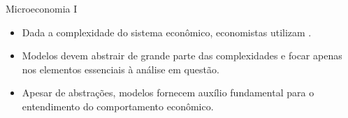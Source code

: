 \documentclass[10pt]{beamer}
\begin{document}
\begin{frame}
    {Microeconomia I}
    \begin{itemize}
        \item Dada a complexidade do sistema econômico, economistas utilizam .\bigskip
        \item Modelos devem abstrair de grande parte das complexidades e focar apenas nos elementos essenciais à análise em questão.\bigskip
        \item Apesar de abstrações, modelos fornecem auxílio fundamental para o entendimento do comportamento econômico.        
    \end{itemize}
\end{frame}
\end{document}
